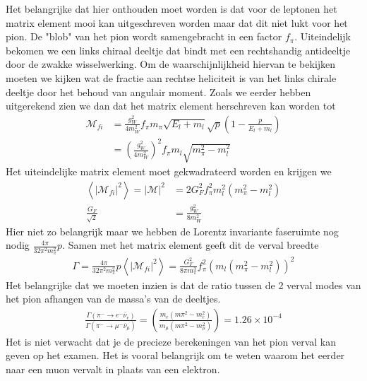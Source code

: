 \documentclass[../main.tex]{subfiles}
\begin{document}
Het belangrijke dat hier onthouden moet worden is dat voor de leptonen het matrix element mooi kan uitgeschreven worden maar dat dit niet lukt voor het pion. De "blob" van het pion wordt samengebracht in een factor $f_\pi$. Uiteindelijk bekomen we een links chiraal deeltje dat bindt met een rechtshandig antideeltje door de zwakke wisselwerking. Om de waarschijnlijkheid hiervan te bekijken moeten we kijken wat de fractie aan rechtse heliciteit is van het links chirale deeltje door het behoud van angulair moment. Zoals we eerder hebben uitgerekend zien we dan dat het matrix element herschreven kan worden tot
\begin{equation}
    \begin{aligned}
        \label{eq:pion_verval_matrix_final}
        \mathcal{M}_{fi} &= \frac{g_W^2}{4m_W^2} f_\pi m_\pi \sqrt{E_l+m_l}\sqrt{p}\left( 1 - \frac{p}{E_l+m_l} \right)\\
                         &= \left( \frac{g_W^2}{4m_W^2} \right)^2 f_\pi m_l \sqrt{m_\pi^2-m_l^2}
    \end{aligned}
\end{equation}
Het uiteindelijke matrix element moet gekwadrateerd worden en krijgen we 
\begin{equation}
    \begin{aligned}
        \label{eq:pion_verval_matrix_final_kwad}
        \left<|\mathcal{M}_{fi}|^2\right> = |\mathcal{M}|^2 &= 2G_F^2 f_\pi^2m_l^2(m_\pi^2-m_l^2)\\
        \frac{G_F}{\sqrt{2}} &= \frac{g_W^2}{8m_W^2}
    \end{aligned}
\end{equation}
Hier niet zo belangrijk maar we hebben de Lorentz invariante faseruimte nog nodig $ \frac{4\pi}{32\pi^2m_\pi^2} p$. Samen met het matrix element geeft dit de verval breedte
\begin{equation}
    \begin{aligned}
        \label{eq:pion_verval_breedte}
        \Gamma = \frac{4\pi}{32\pi^2m_\pi^2} p \left<|\mathcal{M}_{fi}|^2\right> = \frac{G_F^2}{8\pi m_\pi^3} f_\pi^2 \left( m_l(m_\pi^2-m_l^2) \right)^2
    \end{aligned}
\end{equation}
Het belangrijke dat we moeten inzien is dat de ratio tussen de 2 verval modes van het pion afhangen van de massa's van de deeltjes.
\begin{equation}
    \begin{aligned}
        \label{eq:pion_verval_ratio}
        \frac{\Gamma(\pi^- \rightarrow e^-\overline \nu_e)}{\Gamma(\pi^- \rightarrow \mu^-\overline \nu_\mu)}  = \left( \frac{m_e(m\pi^2 - m_e^2)}{m_\mu(m\pi^2 - m_\mu^2)} \right) = 1.26 \times 10^{-4}
    \end{aligned}
\end{equation}
{\color{red} Het is niet verwacht dat je de precieze berekeningen van het pion verval kan geven op het examen. Het is vooral belangrijk om te weten waarom het eerder naar een muon vervalt in plaats van een elektron.}
\end{document}
